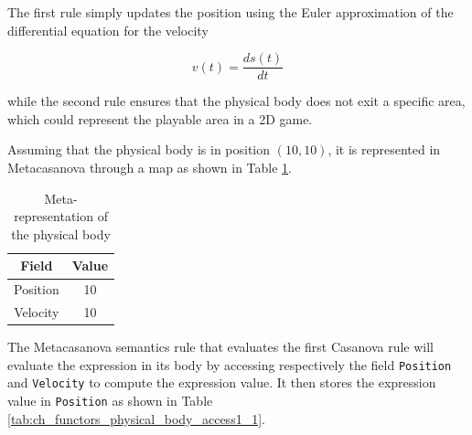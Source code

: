 The first rule simply updates the position using the Euler approximation of the differential equation for the velocity

\begin{equation*}
v(t) = \dfrac{ds(t)}{dt}
\end{equation*}

\noindent
while the second rule ensures that the physical body does not exit a specific area, which could represent the playable area in a 2D game.

Assuming that the physical body is in position $(10,10)$, it is represented in Metacasanova through a map as shown in Table \ref{tab:ch_functors_physical_body}.

\begin{table}
	\centering
	\begin{tabular}{|c|c|}
		\hline
		\textbf{Field} & \textbf{Value} \\
		\hline
		Position	& 10 \\
		\hline
		Velocity & 10 \\
		\hline
	\end{tabular}
	\caption{Meta-representation of the physical body}
	\label{tab:ch_functors_physical_body}
\end{table}

\noindent
The Metacasanova semantics rule that evaluates the first Casanova rule will evaluate the expression in its body by accessing respectively the field \texttt{Position} and \texttt{Velocity} to compute the expression value. It then stores the expression value in \texttt{Position} as shown in Table \ref{tab:ch_functors_physical_body_access1_1}.

